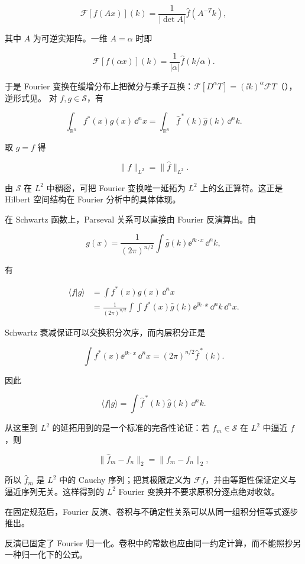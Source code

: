 \[
\mathcal F[f(Ax)](k)=\frac1{|\det A|}\widehat f(A^{-T}k),
\]

其中 $A$ 为可逆实矩阵。一维 $A=\alpha$ 时即

\[
\mathcal F[f(\alpha x)](k)=\frac1{|\alpha|}\widehat f(k/\alpha).
\]

于是 Fourier 变换在缓增分布上把微分与乘子互换：$\mathcal F[D^\alpha T]=(\ii k)^\alpha\mathcal FT$（），逆形式见。
对 $f,g\in\mathcal S$，有

\[
\int_{\mathbb R^n}f^*(x)g(x)\,\dd^n x
=\int_{\mathbb R^n}\widehat f^{\,*}(k)\widehat g(k)\,\dd^n k.
\]

取 $g=f$ 得

\[
\|f\|_{L^2}=\|\widehat f\|_{L^2}.
\]

由 $\mathcal S$ 在 $L^2$ 中稠密，可把 Fourier 变换唯一延拓为 $L^2$ 上的幺正算符。这正是 Hilbert 空间结构在 Fourier 分析中的具体体现。

在 Schwartz 函数上，Parseval 关系可以直接由 Fourier 反演算出。由

\[
g(x)=\frac1{(2\pi)^{n/2}}
\int\widehat g(k)\ee^{\ii k\cdot x}\,\dd^nk,
\]

有

\[
\begin{aligned}
\langle f|g\rangle
&=\int f^*(x)g(x)\,\dd^nx\\
&=\frac1{(2\pi)^{n/2}}
\int\!\int f^*(x)\widehat g(k)\ee^{\ii k\cdot x}\,\dd^nk\,\dd^nx.
\end{aligned}
\]

Schwartz 衰减保证可以交换积分次序，而内层积分正是

\[
\int f^*(x)\ee^{\ii k\cdot x}\,\dd^nx
=(2\pi)^{n/2}\widehat f^{\,*}(k).
\]

因此

\[
\langle f|g\rangle
=\int\widehat f^{\,*}(k)\widehat g(k)\,\dd^nk.
\]

从这里到 $L^2$ 的延拓用到的是一个标准的完备性论证：若 $f_m\in\mathcal S$ 在 $L^2$ 中逼近 $f$，则

\[
\|\widehat f_m-\widehat f_n\|_2
=\|f_m-f_n\|_2,
\]

所以 $\widehat f_m$ 是 $L^2$ 中的 Cauchy 序列；把其极限定义为 $\mathcal Ff$，并由等距性保证定义与逼近序列无关。这样得到的 $L^2$ Fourier 变换并不要求原积分逐点绝对收敛。

在固定规范后，Fourier 反演、卷积与不确定性关系可以从同一组积分恒等式逐步推出。

反演已固定了 Fourier 归一化。卷积中的常数也应由同一约定计算，而不能照抄另一种归一化下的公式。

